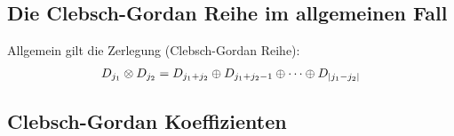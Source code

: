 

\subsection{Die Clebsch-Gordan Reihe im allgemeinen Fall}

Allgemein gilt die Zerlegung (Clebsch-Gordan Reihe):
\begin{align*}
    D_{j_1} \otimes D_{j_2} = D_{j_1 + j_2} \oplus D_{j_1 + j_2 - 1} \oplus \dotsb \oplus D_{\left\vert j_1 - j_2 \right\vert}
\end{align*}


\subsection{Clebsch-Gordan Koeffizienten}

